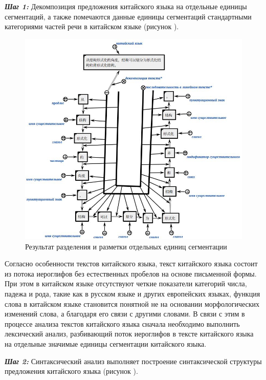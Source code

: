 \textbf{\textit{Шаг 1:}} Декомпозиция предложения китайского языка на отдельные единицы сегментаций, а также помечаются данные единицы сегментаций стандартными категориями частей речи в китайском языке (рисунок \textit{}).
\begin{figure}[H]
	\centering
	\includegraphics[scale=0.6]{images/part4/chapter_chinese/segment_chinese_sentence.png}
	\caption{Результат разделения и разметки отдельных единиц сегментации}
	\label{fig:segment-chinese}
\end{figure}

Согласно особенности текстов китайского языка, текст китайского языка состоит из потока иероглифов без естественных пробелов на основе письменной формы. При этом в китайском языке отсутствуют четкие показатели категорий числа, падежа и рода, такие как в русском языке и других европейских языках, функция слова в китайском языке становится понятной не на основании морфологических изменений слова, а благодаря его связи с другими словами. В связи с этим в процессе анализа текстов китайского языка сначала необходимо выполнить лексический анализ, разбивающий поток иероглифов в тексте китайского языка на отдельные значимые единицы сегментации китайского языка. 

\textbf{\textit{Шаг 2:}} Синтаксический анализ выполняет построение синтаксической структуры предложения китайского языка (рисунок \textit{}).

